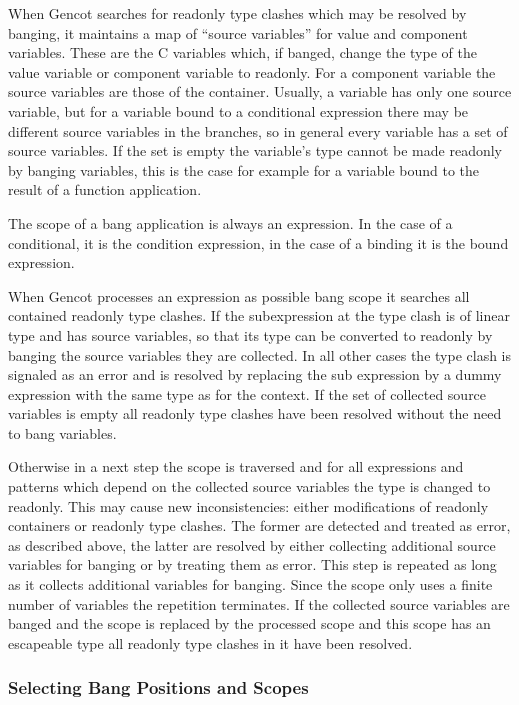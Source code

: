 When Gencot searches for readonly type clashes which may be resolved by banging, it maintains a map of ``source variables'' for
value and component variables. These are the C variables which, if banged, change the type of the value variable or component
variable to readonly. For a component variable the source variables are those of the container. Usually, a variable has only
one source variable, but for a variable bound to a conditional expression there may be different source variables in the branches,
so in general every variable has a set of source variables. If the set is empty the variable's type cannot be made readonly
by banging variables, this is the case for example for a variable bound to the result of a function application.

The scope of a bang application is always an expression. In the case of a conditional, it is the condition expression, in the
case of a binding it is the bound expression.

When Gencot processes an expression as possible bang scope it searches all
contained readonly type clashes. If the subexpression at the type clash is of linear type and has source variables, so that
its type can be converted to readonly by banging the source variables they are collected. In all other cases the type clash
is signaled as an error and is resolved by replacing the sub expression by a dummy expression with the same type as for the
context. If the set of collected source variables is empty all readonly type clashes have been resolved without the need to
bang variables.

Otherwise in a next step the scope is traversed and for all expressions and patterns which depend on the collected source
variables the type is changed to readonly. This may cause new inconsistencies: either modifications of readonly containers
or readonly type clashes. The former are detected and treated as error, as described above, the latter are resolved by either
collecting additional source variables for banging or by treating them as error. This step is repeated as long as it collects
additional variables for banging. Since the scope only uses a finite number of variables the repetition terminates. If the
collected source variables are banged and the scope is replaced by the processed scope and this scope has an escapeable type
all readonly type clashes in it have been resolved.

\subsubsection{Selecting Bang Positions and Scopes}

